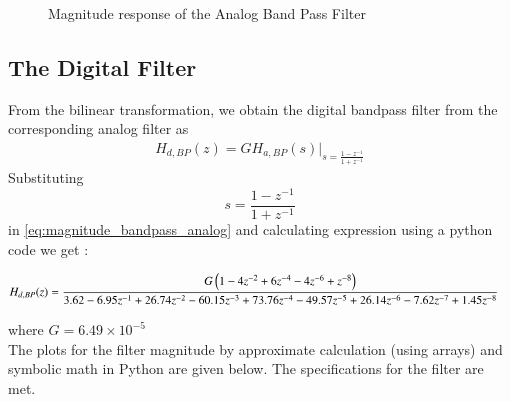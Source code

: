 \documentclass[journal,12pt,twocolumn]{IEEEtran}
\theoremstyle{remark}
\begin{document}
\begin{enumerate}
\begin{figure}[h]
    \caption{Magnitude response of the Analog Band Pass Filter}
    \label{fig:anlg_resp}
\end{figure}
\end{enumerate}

\subsection{The Digital Filter}
From the bilinear transformation, we obtain the digital bandpass filter from the corresponding analog filter as
\begin{align}
    H_{d,BP}(z) = GH_{a,BP}(s)\big\vert_{s = \frac{1-z^{-1}}{1 + z^{-1}}}
\end{align}
Substituting $$s=\dfrac{1-z^{-1}}{1+z^{-1}}$$ in \eqref{eq:magnitude_bandpass_analog} and calculating expression using a python code we get :
\begin{tiny}
\begin{align}
    H_{d,BP}(z) &= \dfrac{G\left(1 - 4z^{-2} + 6z^{-4} - 4z^{-6} + z^{-8}\right)}{3.62 - 6.95z^{-1} + 26.74z^{-2} - 60.15z^{-3} + 73.76z^{-4} - 49.57z^{-5} + 26.14z^{-6} - 7.62z^{-7} + 1.45z^{-8}}
\end{align}
\end{tiny}
where $G=6.49\times 10^{-5}$   \\ 
The plots for the filter magnitude by approximate calculation (using arrays) and symbolic math in Python are given below. The specifications for the filter are met.
\end{document}
